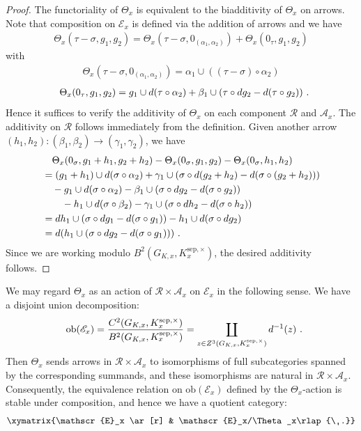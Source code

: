 \documentclass[a4paper]{amsart}
\theoremstyle{definition}
\numberwithin{equation}{section}
\begin{document}
\begin{proof} The functoriality of $\Theta_x$ is equivalent to the biadditivity of $\Theta_x$ on arrows. Note that composition on $\mathscr{E}_x$ is defined via the addition of arrows and we have
\begin{align*}
    \Theta_x(\tau-\sigma,g_1,g_2)=\Theta_x(\tau-\sigma,0_{(\alpha_1,\alpha_2)})+\Theta_x(0_\tau,g_1,g_2)
\end{align*}
with
\begin{align*}
    \Theta_x(\tau-\sigma,0_{(\alpha_1,\alpha_2)})=\alpha_1\cup((\tau-\sigma)\circ\alpha_2)
\end{align*}
\begin{align*}
    \Theta_x(0_\tau,g_1,g_2)=g_1\cup d(\tau\circ\alpha_2)+\beta_1\cup(\tau\circ dg_2-d(\tau\circ g_2))\rlap{\ .}
\end{align*}
Hence it suffices to verify the additivity of $\Theta_x$ on each component $\mathscr{R}$ and $\mathscr{A}_x$. The additivity on $\mathscr{R}$ follows immediately from the definition.  Given another arrow $(h_1,h_2):(\beta_1,\beta_2)\rightarrow(\gamma_1,\gamma_2)$, we have
\begin{align*}
    &\quad\Theta_x(0_\sigma,g_1+h_1,g_2+h_2)-\Theta_x(0_\sigma,g_1,g_2)-\Theta_x(0_\sigma,h_1,h_2)\\
    &=(g_1+h_1)\cup d(\sigma\circ\alpha_2)+\gamma_1\cup(\sigma\circ d(g_2+h_2)-d(\sigma\circ(g_2+h_2)))\\
    &\quad-g_1\cup d(\sigma\circ\alpha_2)-\beta_1\cup(\sigma\circ dg_2-d(\sigma\circ g_2))\\
    &\quad\quad-h_1\cup d(\sigma\circ\beta_2)-\gamma_1\cup(\sigma\circ dh_2-d(\sigma\circ h_2))\\
    &=dh_1\cup(\sigma\circ dg_1-d(\sigma\circ g_1))-h_1\cup d(\sigma\circ dg_2)\\
    &=d(h_1\cup(\sigma\circ dg_2-d(\sigma\circ g_1)))\rlap{\ .}
\end{align*}
Since we are working modulo $B^2(G_{K,x},K_x^{\mathrm{sep},\times})$, the desired additivity follows.
\end{proof}

We may regard $\Theta_x$ as an action of $\mathscr{R}\times\mathscr{A}_x$ on $\mathscr{E}_x$ in the following sense. We have a disjoint union decomposition:
\begin{align*}
    \mathrm{ob}(\mathscr{E}_x)=\frac{C^2(G_{K,x},K_x^{\mathrm{sep},\times})}{B^2(G_{K,x},K_x^{\mathrm{sep},\times})}=\coprod_{z\in Z^3(G_{K,x},K_x^{\mathrm{sep},\times})}d^{-1}(z)\rlap{\ .}
\end{align*}
Then $\Theta_x$ sends arrows in $\mathscr{R}\times\mathscr{A}_x$ to isomorphisms of full subcategories spanned by the corresponding summands, and these isomorphisms are natural in $\mathscr{R}\times\mathscr{A}_x$. Consequently, the equivalence relation on $\mathrm{ob}(\mathscr{E}_x)$ defined by the $\Theta_x$-action is stable under composition, and hence we have a quotient category:
\begin{align*}
    \xymatrix{\mathscr{E}_x \ar[r] & \mathscr{E}_x/\Theta_x\rlap{\ .}}
\end{align*}
\end{document}
